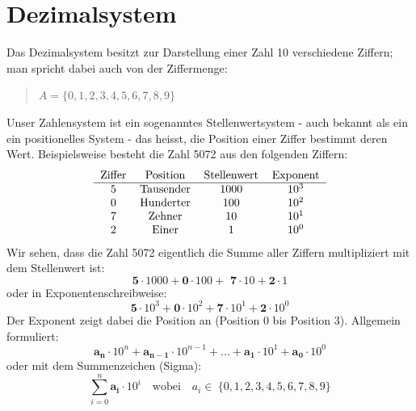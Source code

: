 \documentclass[a4paper,10pt]{report}
\begin{document}
\section{Dezimalsystem}
Das Dezimalsystem besitzt zur Darstellung einer Zahl 10 verschiedene Ziffern; man spricht dabei auch von der Ziffermenge: 
\begin{quote}$A=\{0,1,2,3,4,5,6,7,8,9\}$\end{quote}
Unser Zahlensystem ist ein sogenanntes Stellenwertsystem - auch bekannt als ein ein positionelles System - das heisst, die Position einer Ziffer bestimmt deren Wert. Beispielsweise besteht die Zahl 5072 aus den folgenden Ziffern:
\begin{equation*}\begin{tabular}{c c c c}
Ziffer & Position & Stellenwert & Exponent \\
\hline
5 & Tausender &  1000 & $10^3$ \\
0 & Hunderter & 100 & $10^2$ \\
7 & Zehner & 10 & $10^1$ \\
2 & Einer & 1 & $10^0$ \\
\end{tabular}\end{equation*}
Wir sehen, dass die Zahl 5072 eigentlich die Summe aller Ziffern multipliziert mit dem Stellenwert ist: 
\begin{equation*}\textbf{5} \cdot 1000 + \textbf{0} \cdot 100 +\textbf{ 7} \cdot 10 + \textbf{2} \cdot 1\end{equation*}
oder in Exponentenschreibweise:
\begin{equation*}\textbf{5} \cdot 10^3 + \textbf{0} \cdot 10^2 + \textbf{7} \cdot 10^1 + \textbf{2} \cdot 10^0\end{equation*}
Der Exponent zeigt dabei die Position an (Position 0 bis Position 3). Allgemein formuliert:
\begin{equation*}\boldsymbol{a_n} \cdot 10^n + \boldsymbol{a_{n-1}} \cdot 10^{n-1} + ... + \boldsymbol{a_1} \cdot 10^1 + \boldsymbol{a_0} \cdot 10^0 \end{equation*}
oder mit dem Summenzeichen (Sigma):
\begin{equation*}\sum_{i=0}^{n} \boldsymbol{a_i} \cdot 10^i \quad \mbox{wobei}\quad a_i \in\ \{0, 1, 2, 3, 4, 5, 6, 7, 8, 9\}\end{equation*}
\end{document}
